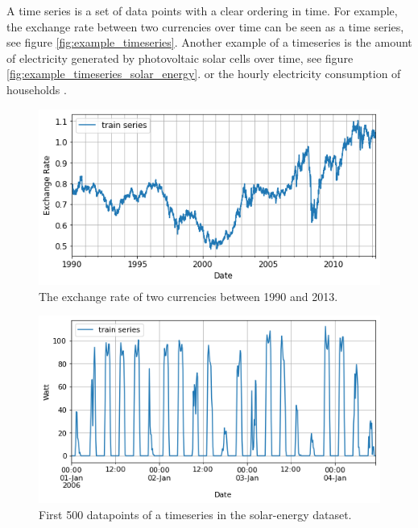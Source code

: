 


\graphicspath{{2_background/figures/}}
A time series is a set of data points with a clear ordering in time. For example, the exchange rate between two currencies over time can be seen as a time series, see figure \ref{fig:example_timeseries}. Another example of a timeseries is the amount of electricity generated by photovoltaic solar cells over time, see figure \ref{fig:example_timeseries_solar_energy}. or the hourly electricity consumption of households \cite{gluonts_paper}.

\begin{figure}[htb]
    \centering
        \includegraphics[width=\linewidth]{2_background/figures/exchange_rate_example.png}
            \caption{The exchange rate of two currencies between 1990 and 2013.}
    \endminipage\hfill
\end{figure}
\label{fig:example_timeseries}

\begin{figure}[htb]
    \centering
        \includegraphics[width=\linewidth]{2_background/figures/solar_energy_zoomed_timeseries_3.png}
        \caption{First 500 datapoints of a timeseries in the solar-energy dataset.}
    \endminipage\hfill
\end{figure}
\label{fig:example_timeseries_solar_energy}

